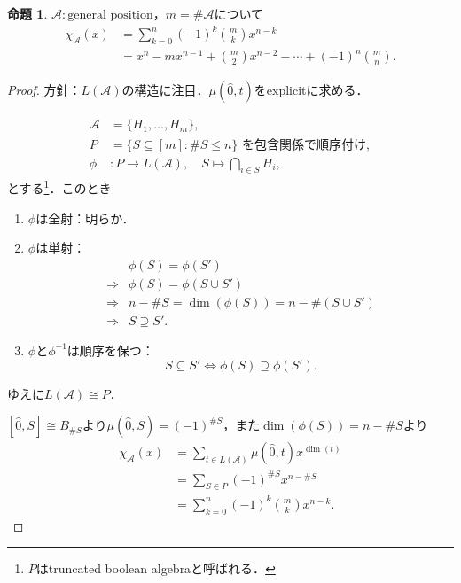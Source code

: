 \documentclass[xelatex,ja=standard,a4paper,14pt,everyparhook=compat]{bxjsarticle}
\newcommand{\mcA}{\mathcal{A}}
\theoremstyle{definition}
\newtheorem*{proposition}{命題}
\begin{document}
\begin{proposition}
    $\mcA:\text{general position}$，$m = \#\mcA$について \begin{align*}
        \chi_\mcA(x) & = \sum_{k=0}^n (-1)^k \binom{m}{k} x^{n-k}                            \\
                     & = x^n - mx^{n-1} + \binom{m}{2}x^{n-2} - \cdots + (-1)^n\binom{m}{n}.
    \end{align*}
\end{proposition}
\begin{proof}
    方針：$L(\mcA)$の構造に注目．$\mu(\hat0,t)$をexplicitに求める．

    \begin{align*}
        \mcA & = \{H_1,\ldots,H_m\},                                           \\
        P    & = \{S \subseteq [m] : \#S \leq n\}\text{ を包含関係で順序付け}, \\
        \phi & : P \to L(\mcA), \quad S \mapsto \bigcap_{i \in S} H_i,
    \end{align*}
    とする\footnote{$P$はtruncated boolean algebraと呼ばれる．}．このとき \begin{enumerate}
        \item $\phi$は全射：明らか．
        \item $\phi$は単射： \begin{align*}
                                    & \phi(S) = \phi(S')                          \\
                  \Longrightarrow{} & \phi(S) = \phi(S \cup S')                   \\
                  \Longrightarrow{} & n - \#S = \dim(\phi(S)) = n - \#(S \cup S') \\
                  \Longrightarrow{} & S \supseteq S'.
              \end{align*}
        \item $\phi$と$\phi^{-1}$は順序を保つ： \begin{equation*}
                  S \subseteq S' \iff \phi(S) \supseteq \phi(S').
              \end{equation*}
    \end{enumerate}
    ゆえに$L(\mcA) \cong P$．

    $[\hat0,S] \cong B_{\#S}$より$\mu(\hat0,S) = (-1)^{\#S}$，また$\dim(\phi(S)) = n - \#S$より \begin{align*}
        \chi_\mcA(x) & = \sum_{t \in L(\mcA)} \mu(\hat0,t) x^{\dim(t)} \\
                     & = \sum_{S \in P} (-1)^{\#S} x^{n-\#S}           \\
                     & = \sum_{k=0}^n (-1)^k \binom{m}{k} x^{n-k}.
    \end{align*}
\end{proof}
\end{document}
